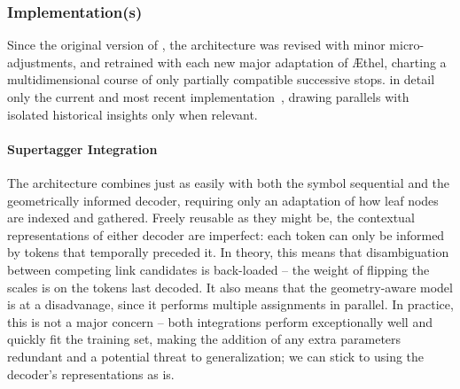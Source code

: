 \subsubsection{Implementation(s)}
Since the original version of \citet{kogkalidis-etal-2020-neural}, the architecture was revised with minor micro-adjustments, and retrained with each new major adaptation of \AE thel, charting a multidimensional course of only partially compatible successive stops.
 in detail only the current and most recent implementation~\cite{spindle}, drawing parallels with isolated historical insights only when relevant.

\paragraph{Supertagger Integration}
The architecture combines just as easily with both the symbol sequential and the geometrically informed decoder, requiring only an adaptation of how leaf nodes are indexed and gathered.
Freely reusable as they might be, the contextual representations of either decoder are imperfect: each token can only be informed by tokens that temporally preceded it.
In theory, this means that disambiguation between competing link candidates is back-loaded -- the weight of flipping the scales is on the tokens last decoded. 
It also means that the geometry-aware model is at a disadvanage, since it performs multiple assignments in parallel.
In practice, this is not a major concern -- both integrations perform exceptionally well and quickly fit the training set, making the addition of any extra parameters redundant and a potential threat to generalization; we can stick to using the decoder's representations as is.

